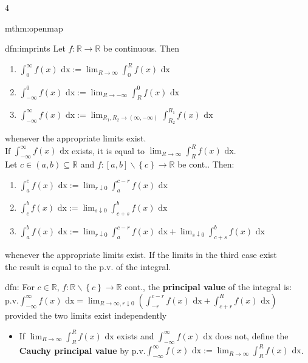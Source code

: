 \documentclass[landscape, 8pt]{extarticle}
\begin{document}
\begin{multicols*}{4}
\begin{mthm}{mthm:openmap}{ }
		\end{mthm}
		
		
		\begin{dfn}{dfn:imprints}{ }
			Let $f: \mathbb{R} \to \mathbb{R}$ be continuous. Then\\
			\begin{enumerate}[label=(\roman*)]
				\item $\int_{0}^{\infty} f(x) \text{ dx} := \lim_{R\to \infty} \int_{0}^{R} f(x) \text{ dx}$
				\item $\int_{-\infty}^{0} f(x) \text{ dx} := \lim_{R\to -\infty} \int_{R}^{0}f(x) \text{ dx}$
				\item $\int_{-\infty}^{\infty} f(x) \text{ dx} := \lim_{R_1, R_2\to (\infty, -\infty)} \int_{R_2}^{R_1}f(x) \text{ dx}$
			\end{enumerate}
			whenever the appropriate limits exist. \\
			If $\int_{-\infty}^{\infty} f(x) \text{ dx}$ exists, it is equal to $\lim_{R\to \infty} \int_{R}^{R}f(x) \text{ dx}$.\\
			
			Let $c \in (a, b) \subseteq \mathbb{R}$ and $f: [a, b] \backslash \left\{c\right\} \to \mathbb{R}$ be cont.. Then:
			\begin{enumerate}[label=(\roman*)]
				\item $\int_{a}^{c}f(x) \text{ dx} := \lim_{r \downarrow 0 } \int_{a}^{c-r} f(x) \text{ dx}$
				\item $\int_{c}^{b}f(x) \text{ dx} := \lim_{s \downarrow 0} \int_{c+s}^{b}f(x) \text{ dx}$
				\item $\int_{a}^{b}f(x) \text{ dx} := \lim_{r \downarrow 0 } \int_{a}^{c-r} f(x) \text{ dx} + \lim_{s \downarrow 0} \int_{c+s}^{b}f(x) \text{ dx}$
			\end{enumerate}	
			whenever the appropriate limits exist. If the limits in the third case exist\\
			the result is equal to the p.v. of the integral.
			
		\end{dfn}
		
		
		\begin{dfn}{dfn:}{ }
			For $c \in \mathbb{R}$, $f: \mathbb{R} \backslash \left\{c\right\} \to \mathbb{R}$ cont., the \textbf{principal value} of the integral is:\\
			p.v.$\int_{-\infty}^{\infty}f(x) \text{ dx} = \lim_{R\to \infty, r \downarrow 0} \left(\int_{-r}^{c-r}f(x) \text{ dx} + \int_{c + r}^{R} f(x) \text{ dx}\right)$ provided the two limits exist independently
			\begin{itemize}
			\item If $\lim_{R\to \infty} \int_{R}^{R}f(x) \text{ dx}$ exists and $\int_{-\infty}^{\infty} f(x) \text{ dx}$ does not, define the \textbf{Cauchy principal value} by p.v.$\int_{-\infty}^{\infty} f(x) \text{ dx} := \lim_{R\to \infty} \int_{R}^{R}f(x) \text{ dx}$.
			\end{itemize}
			

\end{dfn}
\end{multicols*}
\end{document}
